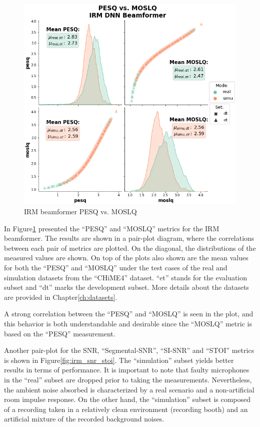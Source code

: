 \begin{figure}[H]
    \centering
    \includegraphics[width=\linewidth]{Experiments/images/irm_pesq_mosq}
    \caption{IRM beamformer PESQ vs. MOSLQ}\label{fig:irm_pesq_mosq}
\end{figure}

In Figure\;\ref{fig:irm_pesq_mosq} presented the ``PESQ'' and ``MOSLQ'' 
metrics for the IRM beamformer. The results are shown in a pair-plot
diagram, where the correlations between each pair of metrics are plotted.
On the diagonal, the distributions of the measured values are shown.
On top of the plots also shown are the mean values for both 
the ``PESQ'' and ``MOSLQ'' under the test cases of the real and 
simulation datasets from the ``CHiME4'' dataset. ``et'' stands for
the evaluation subset and ``dt'' marks the development subset.
More details about the datasets are provided in Chapter\;\ref{ch:datasets}.

A strong correlation between the ``PESQ'' and ``MOSLQ'' is seen in the
plot, and this behavior is both understandable and desirable since
the ``MOSLQ'' metric is based on the ``PESQ'' measurement.

Another pair-plot for the SNR, ``Segmental-SNR'', ``SI-SNR'' and ``STOI''
metrics is shown in Figure\;\ref{fig:irm_snr_stoi}.
The ``simulation'' subset yields better results in terms of
performance. It is important to note that faulty microphones
in the ``real'' subset are dropped prior to taking the measurements.
Nevertheless, the ambient noise absorbed is characterized by
a real scenario and a non-artificial room impulse response. On the other hand,
the ``simulation'' subset is composed of a recording taken in a relatively
clean environment (recording booth) and an artificial mixture of
the recorded background noises.

